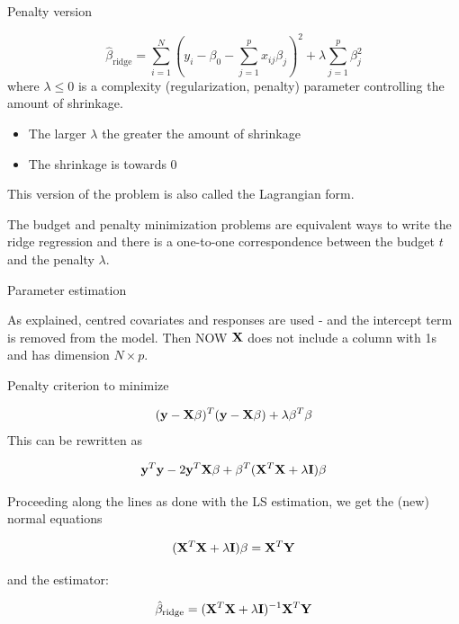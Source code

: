 \documentclass[
  ignorenonframetext,
]{beamer}
\providecommand{\tightlist}{%
  \setlength{\itemsep}{0pt}\setlength{\parskip}{0pt}}
\begin{document}
\begin{frame}

\begin{block}{Penalty version}

\[ \hat{\beta}_{\text{ridge}}= \sum_{i=1}^N (y_i-\beta_0-\sum_{j=1}^p x_{ij}\beta_j )^2 + \lambda \sum_{j=1}^p \beta_j^2\]
where \(\lambda \le 0\) is a complexity (regularization, penalty)
parameter controlling the amount of shrinkage.

\begin{itemize}
\tightlist
\item
  The larger \(\lambda\) the greater the amount of shrinkage
\item
  The shrinkage is towards 0
\end{itemize}

This version of the problem is also called the Lagrangian form.

The budget and penalty minimization problems are equivalent ways to
write the ridge regression and there is a one-to-one correspondence
between the budget \(t\) and the penalty \(\lambda\).

\end{block}

\end{frame}

\begin{frame}

\begin{block}{Parameter estimation}

As explained, centred covariates and responses are used - and the
intercept term is removed from the model. Then NOW \({\bf X}\) does not
include a column with 1s and has dimension \(N \times p\).

Penalty criterion to minimize

\[ ({\bf y}-{\bf X}\beta)^T ({\bf y}-{\bf X}\beta)+ \lambda \beta^T \beta \]
This can be rewritten as

\[ {\bf y}^T{\bf y}-2{\bf y}^T{\bf X}\beta+\beta^T({\bf X}^T{\bf X}+\lambda {\bf I})\beta\]

\end{block}

\end{frame}

\begin{frame}

Proceeding along the lines as done with the LS estimation, we get the
(new) normal equations

\[ ({\bf X}^T{\bf X}+\lambda {\bf I})\beta= {\bf X}^T {\bf Y}\]

and the estimator:

\[ \hat{\beta}_{\text{ridge}}=({\bf X}^T{\bf X}+\lambda {\bf I})^{-1} {\bf X}^T {\bf Y}\]

\end{frame}
\end{document}
